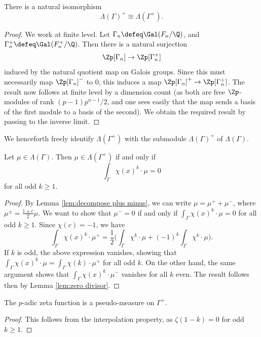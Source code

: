\documentclass[a4paper,10pt, english, reqno]{smfart}
\newcommand{\GG}{\Gamma}
\numberwithin{equation}{section}
\begin{document}
\begin{lemma}
	There is a natural isomorphism
	\[\Lambda(\GG)^+ \cong \Lambda(\GG^+).\]
\end{lemma}

\begin{proof}
	We work at finite level. Let $\GG_n \defeq \Gal(F_n/\Q)$, and $\GG_n^+ \defeq \Gal(F_n^+/\Q)$. Then there is a natural surjection
	\[\Zp[\GG_n] \to \Zp[\GG_n^+] \]
	induced by the natural quotient map on Galois groups. Since this must necessarily map $\Zp[\GG_n]^-$ to 0, this induces a map $\Zp[\GG_n]^+ \rightarrow \Zp[\GG_n^+]$. The result now follows at finite level by a dimension count (as both are free $\Zp$-modules of rank $(p-1)p^{n-1}/2$,  and one sees easily that the map sends a basis of the first module to a basis of the second). We obtain the required result by passing to the inverse limit.
\end{proof}

We henceforth freely identify $\Lambda(\GG^+)$ with the submodule $\Lambda(\GG)^+$ of $\Lambda(\GG)$.

\begin{lemma}
	Let $\mu \in \Lambda(\GG)$. Then $\mu \in \Lambda(\GG^+)$ if and only if
	\[\int_{\GG}\chi(x)^k \cdot\mu = 0\]
	for all odd $k \geq 1$.
\end{lemma}

\begin{proof}
By Lemma \ref{lem:decompose plus minus}, we can write $\mu = \mu^+ + \mu^-$, where $\mu^\pm = \frac{1 \pm c}{2} \mu$. We want to show that $\mu^- = 0$ if and only if $ \int_{\GG}\chi(x)^k \cdot\mu = 0$ for all odd $k \geq 1$. Since $\chi(c) = -1$, we have
\[ \int_{\GG}\chi(x)^k \cdot \mu^+ = \frac{1}{2} \bigg( \int_\GG \chi^k \cdot \mu +  (-1)^k \int_\GG \chi^k \cdot \mu \bigg). \]
If $k$ is odd, the above expression vanishes, showing that $\int_\Gamma \chi(x)^k \cdot \mu = \int_\Gamma \chi(k) \cdot \mu^+$ for all odd $k$. On the other hand, the same argument shows that $\int_\Gamma \chi(x)^k \cdot \mu^-$ vanishes for all $k$ even. The result follows then by Lemma \ref{lem:zero divisor}.
\end{proof}



\begin{corollary}
	The $p$-adic zeta function is a pseudo-measure on $\GG^+$.
\end{corollary}

\begin{proof}
	This follows from the interpolation property, as $\zeta(1-k) = 0$ for odd $k\geq 1$.
\end{proof}
\end{document}
